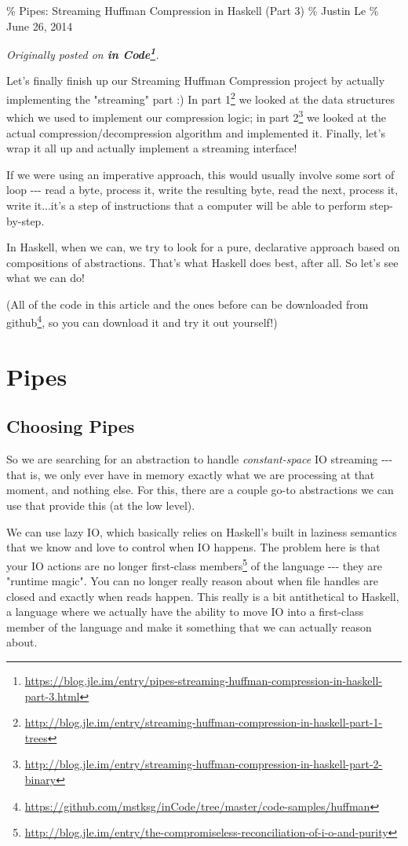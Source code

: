 \documentclass[]{article}
\renewcommand{\href}[2]{#2\footnote{\url{#1}}}
\begin{document}
\% Pipes: Streaming Huffman Compression in Haskell (Part 3) \% Justin Le \% June
26, 2014

\emph{Originally posted on
\textbf{\href{https://blog.jle.im/entry/pipes-streaming-huffman-compression-in-haskell-part-3.html}{in
Code}}.}

Let's finally finish up our Streaming Huffman Compression project by actually
implementing the "streaming" part :) In
\href{http://blog.jle.im/entry/streaming-huffman-compression-in-haskell-part-1-trees}{part
1} we looked at the data structures which we used to implement our compression
logic; in
\href{http://blog.jle.im/entry/streaming-huffman-compression-in-haskell-part-2-binary}{part
2} we looked at the actual compression/decompression algorithm and implemented
it. Finally, let's wrap it all up and actually implement a streaming interface!

If we were using an imperative approach, this would usually involve some sort of
loop -\/-\/- read a byte, process it, write the resulting byte, read the next,
process it, write it...it's a step of instructions that a computer will be able
to perform step-by-step.

In Haskell, when we can, we try to look for a pure, declarative approach based
on compositions of abstractions. That's what Haskell does best, after all. So
let's see what we can do!

(All of the code in this article and the ones before can be downloaded
\href{https://github.com/mstksg/inCode/tree/master/code-samples/huffman}{from
github}, so you can download it and try it out yourself!)

\section{Pipes}

\subsection{Choosing Pipes}

So we are searching for an abstraction to handle \emph{constant-space} IO
streaming -\/-\/- that is, we only ever have in memory exactly what we are
processing at that moment, and nothing else. For this, there are a couple go-to
abstractions we can use that provide this (at the low level).

We can use lazy IO, which basically relies on Haskell's built in laziness
semantics that we know and love to control when IO happens. The problem here is
that your IO actions are no longer
\href{http://blog.jle.im/entry/the-compromiseless-reconciliation-of-i-o-and-purity}{first-class
members} of the language -\/-\/- they are "runtime magic". You can no longer
really reason about when file handles are closed and exactly when reads happen.
This really is a bit antithetical to Haskell, a language where we actually have
the ability to move IO into a first-class member of the language and make it
something that we can actually reason about.
\end{document}
